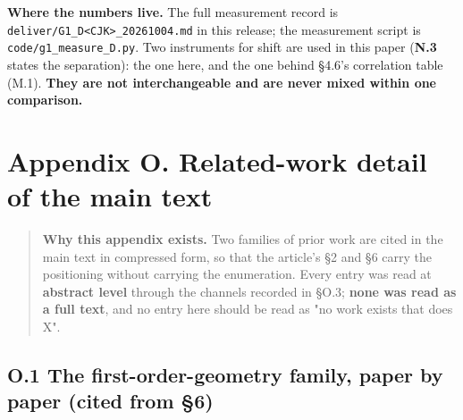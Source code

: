 \documentclass[pdflatex,sn-mathphys-ay]{sn-jnl}
\begin{document}
\textbf{Where the numbers live.} The full measurement record is \texttt{deliver/G1\_D<CJK>\_20261004.md} in this release; the measurement script is \texttt{code/g1\_measure\_D.py}. Two instruments for shift are used in this paper (\textbf{N.3} states the separation): the one here, and the one behind \S{}4.6's correlation table (M.1). \textbf{They are not interchangeable and are never mixed within one comparison.}

\section*{Appendix O. Related-work detail of the main text}

\begin{quote}
\textbf{Why this appendix exists.} Two families of prior work are cited in the main text in compressed form, so that the article's \S{}2 and \S{}6 carry the positioning without carrying the enumeration. Every entry was read at \textbf{abstract level} through the channels recorded in \S{}O.3; \textbf{none was read as a full text}, and no entry here should be read as "no work exists that does X".
\end{quote}

\subsection*{O.1 The first-order-geometry family, paper by paper (cited from \S{}6)}
\end{document}
